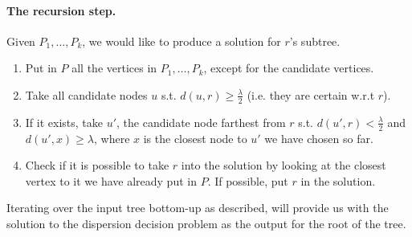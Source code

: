 \documentclass[11pt,a4paper]{article}
\theoremstyle{definition}
\theoremstyle{remark}
\begin{document}
\paragraph{The recursion step.} Given $P_{1},\ldots,P_{k}$, we would like to produce a solution for $r$'s subtree.
\begin{enumerate}
\item Put in $P$ all the vertices in $P_{1},\ldots,P_{k}$, except for the candidate vertices.
\item Take all candidate nodes $u$ s.t. $d(u,r) \geq \frac{\lambda}{2}$ (i.e. they are certain w.r.t $r$).
\item If it exists, take $u'$, the candidate node farthest from $r$ s.t. $d(u',r) < \frac{\lambda}{2}$ and $d(u',x)\geq \lambda$, where $x$ is the closest node to $u'$ we have chosen so far.
\item Check if it is possible to take $r$ into the solution by looking at the closest vertex to it we have already put in $P$. If possible, put $r$ in the solution.
\end{enumerate}
Iterating over the input tree bottom-up as described, will provide us with the solution to the dispersion decision problem as the output for the root of the tree.
\end{document}
